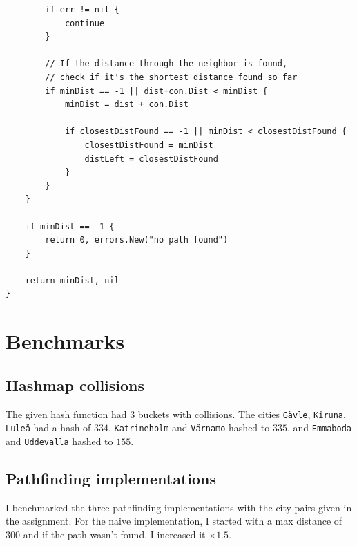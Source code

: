 \documentclass[a4paper,11pt]{article}
\begin{document}
\begin{verbatim}
        if err != nil {
            continue
        }

        // If the distance through the neighbor is found,
        // check if it's the shortest distance found so far
        if minDist == -1 || dist+con.Dist < minDist {
            minDist = dist + con.Dist

            if closestDistFound == -1 || minDist < closestDistFound {
                closestDistFound = minDist
                distLeft = closestDistFound
            }
        }
    }

    if minDist == -1 {
        return 0, errors.New("no path found")
    }

    return minDist, nil
}
    \end{verbatim}

    \section*{Benchmarks}
    \subsection*{Hashmap collisions}

    The given hash function had 3 buckets with collisions. The cities \texttt{Gävle}, \texttt{Kiruna}, \texttt{Luleå} had a hash of $334$, \texttt{Katrineholm} and \texttt{Värnamo} hashed to $335$, and \texttt{Emmaboda} and \texttt{Uddevalla} hashed to $155$.

    \subsection*{Pathfinding implementations}

    I benchmarked the three pathfinding implementations with the city pairs given in the assignment. For the naive implementation, I started with a max distance of $300$ and if the path wasn't found, I increased it $\times1.5$.
\end{document}
